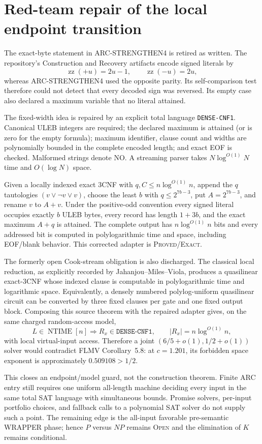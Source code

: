 \section{Red-team repair of the local endpoint transition}

The exact-byte statement in ARC-STRENGTHEN4 is retired as written.  The
repository's Construction and Recovery artifacts encode signed literals by
\[
 \operatorname{zz}(+u)=2u-1,\qquad \operatorname{zz}(-u)=2u,
\]
whereas ARC-STRENGTHEN4 used the opposite parity.  Its self-comparison test
therefore could not detect that every decoded sign was reversed.  Its empty
case also declared a maximum variable that no literal attained.

The fixed-width idea is repaired by an explicit total language
\texttt{DENSE-CNF1}.  Canonical ULEB integers are required; the declared
maximum is attained (or is zero for the empty formula); maximum identifier,
clause count and widths are polynomially bounded in the complete encoded
length; and exact EOF is checked.  Malformed strings denote NO.  A streaming
parser takes $N\log^{O(1)}N$ time and $O(\log N)$ space.

Given a locally indexed exact 3CNF with $q,C\le n\log^{O(1)}n$, append the
$q$ tautologies $(v\vee\neg v\vee v)$, choose the least $b$ with
$q\le2^{7b-3}$, put $A=2^{7b-3}$, and rename $v$ to $A+v$.  Under the
positive-odd convention every signed literal occupies exactly $b$ ULEB
bytes, every record has length $1+3b$, and the exact maximum $A+q$ is
attained.  The complete output has $n\log^{O(1)}n$ bits and every addressed
bit is computed in polylogarithmic time and space, including EOF/blank
behavior.  This corrected adapter is \textsc{Proved/Exact}.

The formerly open Cook-stream obligation is also discharged.  The classical
local reduction, as explicitly recorded by Jahanjou--Miles--Viola, produces a
quasilinear exact-3CNF whose indexed clause is computable in polylogarithmic
time and logarithmic space.  Equivalently, a densely numbered polylog-uniform
quasilinear circuit can be converted by three fixed clauses per gate and one
fixed output block.  Composing this source theorem with the repaired adapter
gives, on the same charged random-access model,
\[
 L\in\operatorname{NTIME}[n]
 \Longrightarrow R_x\in\texttt{DENSE-CNF1},\qquad
 |R_x|=n\log^{O(1)}n,
\]
with local virtual-input access.  Therefore a joint
$(6/5+o(1),1/2+o(1))$ solver would contradict FLMV Corollary~5.8: at
$c=1.201$, its forbidden space exponent is approximately $0.509108>1/2$.

This closes an endpoint/model guard, not the construction theorem.  Finite
ARC entry still requires one uniform all-length machine deciding every input
in the same total SAT language with simultaneous bounds.  Promise solvers,
per-input portfolio choices, and fallback calls to a polynomial SAT solver do
not supply such a point.  The remaining edge is the all-input favorable
pre-semantic WRAPPER phase; hence $P$ versus $NP$ remains \textsc{Open} and
the elimination of $K$ remains conditional.

